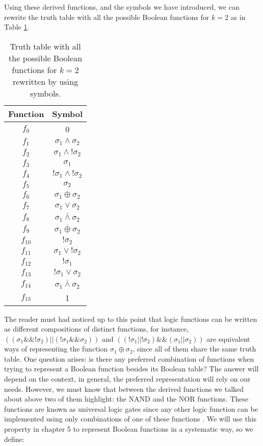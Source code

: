 Using these derived functions, and the symbols we have introduced, we can rewrite the truth table with all the possible Boolean functions for $k=2$ as in Table \ref{tab:k_2_table}.\\

\begin{table}[h]
\centering
\begin{tabular}{ |c||c| } 
 \hline
 Function & Symbol  \\ 
 \hline
 \hline
 $f_{0}$ & 0\\ 
 \hline
 $f_{1}$ & $\sigma_{1} \wedge \sigma_{2}$\\ 
 \hline
 $f_{2}$ & $\sigma_{1} \wedge ! \sigma_{2}$\\ 
 \hline
 $f_{3}$ & $\sigma_{1}$\\ 
 \hline
 $f_{4}$ & $! \sigma_{1} \wedge ! \sigma_{2}$\\ 
 \hline
 $f_{5}$ & $\sigma_{2}$\\ 
 \hline
 $f_{6}$ & $\sigma_{1} \oplus \sigma_{2} $\\ 
 \hline
 $f_{7}$ & $\sigma_{1} \vee \sigma_{2}$\\ 
 \hline
 $f_{8}$ & $\sigma_{1} \bar{\wedge} \sigma_{2}$\\ 
 \hline
 $f_{9}$ & $\overline{\sigma_{1} \oplus \sigma_{2}} $\\ 
 \hline
 $f_{10}$ & $! \sigma_{2}$\\ 
 \hline
 $f_{11}$ & $\sigma_{1} \vee ! \sigma_{2}$\\ 
 \hline
 $f_{12}$ & $! \sigma_{1}$\\ 
 \hline
 $f_{13}$ & $! \sigma_{1} \vee \sigma_{2}$\\ 
 \hline
 $f_{14}$ & $\sigma_{1} \bar{\wedge} \sigma_{2}$\\ 
 \hline
 $f_{15}$ & 1\\ 
 \hline
\end{tabular}
 \caption{Truth table with all the possible Boolean functions for $k=2$ rewritten by using symbols.}
 \label{tab:k_2_table}
\end{table}

The reader must had noticed up to this point that logic functions can be written as different compositions of distinct functions, for instance, $((\sigma_{1} \& \& ! \sigma_{2})||(! \sigma_{1} \& \& \sigma_{2}))$ and $((! \sigma_{1} || ! \sigma_{2})\& \&( \sigma_{1} || \sigma_{2}))$ are equivalent ways of representing the function $\sigma_{1} \oplus \sigma_{2} $, since all of them share the same truth table. 
One question arises: is there any preferred combination of functions when trying to represent a Boolean function besides its Boolean table? The answer will depend on the context, in general, the preferred representation will rely on our needs. However, we must know that between the derived functions we talked about above two of them highlight: the NAND and the NOR functions. These functions are known as universal logic gates since any other logic function can be implemented using only combinations of one of these functions \cite{universal_gate}. We will use this property in chapter 5 to represent Boolean functions in a systematic way, so we define:

